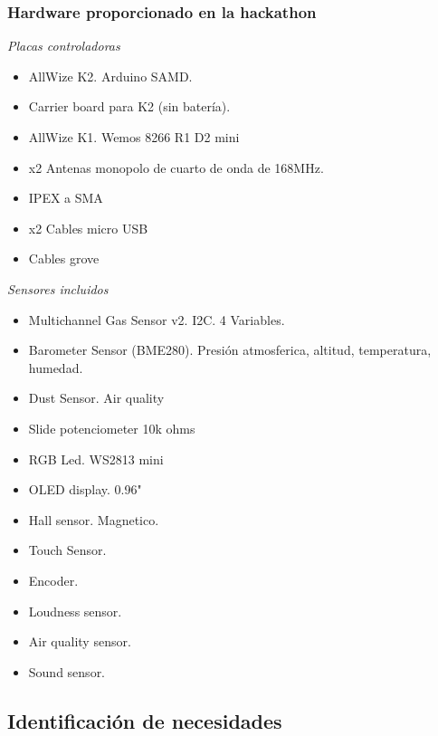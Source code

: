 \documentclass[12pt]{article}
\begin{document}
	\subsubsection{Hardware proporcionado en la hackathon}
	\textit{Placas controladoras}
	\begin{itemize}
		\item AllWize K2. Arduino SAMD. 
		\item Carrier board para K2 (sin batería).
		\item AllWize K1. Wemos 8266 R1 D2 mini 
		\item x2 Antenas monopolo de cuarto de onda de 168MHz.
		\item IPEX a SMA
		\item x2 Cables micro USB
		\item Cables grove
	\end{itemize}
	\textit{Sensores incluidos}
	\begin{itemize}
		\item Multichannel Gas Sensor v2. I2C. 4 Variables.
		
		\item Barometer Sensor (BME280). Presión atmosferica, altitud, temperatura, humedad.
		
		\item Dust Sensor. Air quality
		
		\item Slide potenciometer 10k ohms
		
		\item RGB Led. WS2813 mini
		
		\item OLED display. 0.96"
		
		\item Hall sensor. Magnetico.
		
		\item Touch Sensor.
		
		\item Encoder.
		
		\item Loudness sensor.
		
		\item Air quality sensor.
		
		\item Sound sensor.
	\end{itemize}

	\subsection[Identificación de necesidades]{Identificación de necesidades}
	
\end{document}
